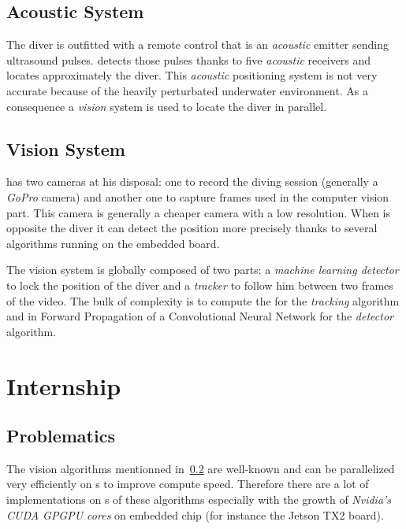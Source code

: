 \subsection{Acoustic System}

The diver is outfitted with a remote control that is an \emph{acoustic} emitter sending ultrasound pulses. \iBubble{} detects those pulses thanks to five \emph{acoustic} receivers and locates approximately the diver. This \emph{acoustic} positioning system is not very accurate because of the heavily perturbated underwater environment. As a consequence a \emph{vision} system is used to locate the diver in parallel.


\subsection{Vision System}

\label{Vision} %

\iBubble{} has two cameras at his disposal: one to record the diving session (generally a \emph{GoPro} camera) and another one to capture frames used in the computer vision part. This camera is generally a cheaper camera with a low resolution. When \iBubble{} is opposite the diver it can detect the position more precisely thanks to several algorithms running on the embedded board.

The vision system is globally composed of two parts: a \emph{machine learning detector} to lock the position of the diver and a \emph{tracker} to follow him between two frames of the video. The bulk of complexity is to compute the \flow{} for the \emph{tracking} algorithm and in Forward Propagation of a Convolutional Neural Network for the \emph{detector} algorithm.


\section{Internship}

\subsection{Problematics}

The vision algorithms mentionned in~\ref{Vision} are well-known and can be parallelized very efficiently on s to improve compute speed. Therefore there are a lot of implementations on s of these algorithms especially with the growth of \emph{Nvidia's CUDA GPGPU cores} on embedded chip (for instance the Jetson TX2 board).

